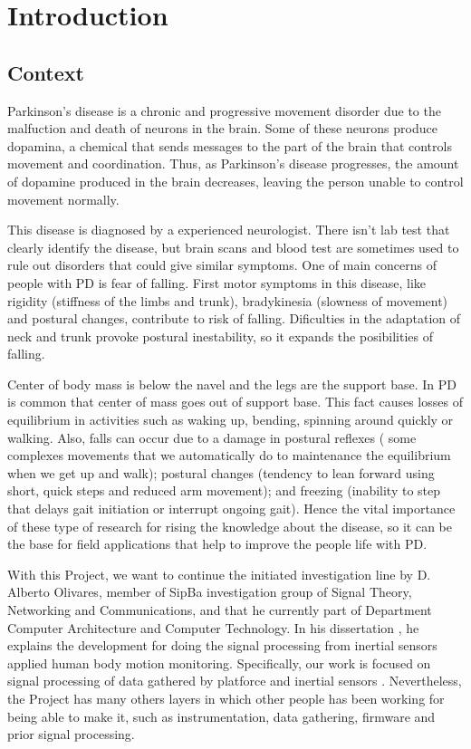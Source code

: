 
\chapter{Introduction}
\label{ch:Introduccion}

\section{Context}
Parkinson’s disease is a chronic and progressive movement disorder due to the malfuction and death of neurons in the brain. Some of these neurons produce dopamina, a chemical that sends messages to the part of the brain that controls movement and coordination. Thus, as Parkinson’s disease progresses,  the amount of dopamine produced in the brain decreases, leaving the person unable to control movement normally.

This disease is diagnosed by a experienced neurologist. There isn’t lab test that clearly identify the disease, but brain scans and blood test are sometimes used to rule out disorders that could give similar symptoms. 
One of main concerns of people with PD is fear of falling. First motor symptoms in this disease, like rigidity (stiffness  of the limbs and trunk), bradykinesia (slowness of movement) and postural changes, contribute to  risk of falling. Dificulties in the adaptation of neck and trunk provoke postural inestability, so it expands the posibilities of falling.

Center of body mass is below the navel and the legs are the support base. In PD is common that center of  mass goes out of support base. This fact causes losses of equilibrium in activities such as waking up, bending, spinning  around quickly or walking. Also, falls can occur due to a damage in postural reflexes ( some complexes movements that we  automatically do to maintenance the equilibrium when we get up and walk); postural changes (tendency to lean forward using short, quick steps and reduced arm movement); and freezing (inability to step that delays gait initiation or interrupt ongoing gait). Hence the vital importance of these type of research for rising the  knowledge about the disease, so it can be the base for  field applications that help to improve the people life with PD. \cite{ParkinsonDisease}\cite{pdf}

With this Project, we want to continue the initiated investigation line by D. Alberto Olivares, member of SipBa investigation group of Signal Theory, Networking and Communications, and that he currently part of Department Computer Architecture and Computer Technology. In his dissertation \cite{A.Olivares2013}, he explains the development for doing the signal processing from inertial sensors applied human body motion monitoring.
Specifically, our work is focused on signal processing of data gathered  by  platforce and inertial sensors . Nevertheless, the Project has many others layers in which  other people has been working for being able to make it, such as instrumentation, data gathering, firmware and prior signal processing.

